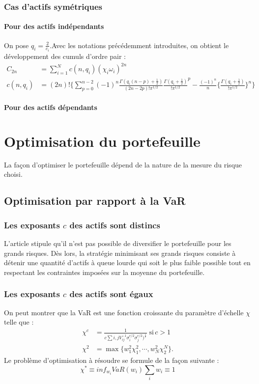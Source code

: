 \documentclass{article}
\begin{document}
     \subsubsection{Cas d'actifs symétriques}
     \paragraph{Pour des actifs indépendants}
     On pose $ q_{i}=\frac{2}{c_{i}}$.Avec les notations précédemment introduites, on obtient le développement des cumuls d'ordre pair :
     \begin{align}
     C_{2n} &= \sum_{i=1}^{N}c(n,q_{i})(\chi _{i}\omega _{i})^{2n}\\
     c(n,q_{i}) &= (2n)!\lbrace \sum_{p=0}^{n-2}(-1)^{n}\frac{\Gamma (q_{i}(n-p)+\frac{1}{2})}{(2n-2p)!\pi ^{1/2}}{\frac{\Gamma (q_{i}+\frac{1}{2})}{!\pi ^{1/2}}}^{p}-\frac{(-1)^{n}}{n}\lbrace \frac{\Gamma (q_{i}+\frac{1}{2})}{!\pi ^{1/2}}\rbrace ^{n}\rbrace
     \end{align}
      \paragraph{Pour des actifs dépendants}
      \section{ Optimisation du portefeuille}
      La façon d'optimiser le portefeuille dépend de la nature de la mesure du risque choisi.
      \subsection{Optimisation par rapport à la VaR}
      \subsubsection{Les exposants $c$ des actifs sont distincs}
       L'article stipule qu'il n'est pas possible de diversifier le portefeuille pour les grands risques. Dès lors, la stratégie minimisant ses grands risques consiste à détenir une quantité d'actifs à queue lourde qui soit le plus faible possible tout en respectant les contraintes imposées sur la moyenne du portefeuille.
       \subsubsection{Les exposants $c$ des actifs sont égaux}
     On peut montrer que la VaR est une fonction croissante du paramètre d'échelle $\chi $ telle que :
     \begin{align}
       \chi ^{c} &= \frac{1}{c\sum i,jV_{ij}^{-1}\sigma_{i}^{c/2}\sigma ^{c/2}_{j})^{\frac{1}{c}}}\;\text{si}\, c>1\\
      \chi ^{2} &= \max \lbrace w^{2}_{1}\chi _{1}^{2},\cdots ,w_{N}^{2}\chi ^{N}_{2}\rbrace.
      \end{align}
       Le problème d'optimisation à résoudre se formule de la façon suivante :
       \begin{equation}
       \chi^{*}\equiv inf_{w_{i}}VaR({w_{i}})
       \sum _{i} w_{i}\equiv 1
       \end{equation}
\end{document}
